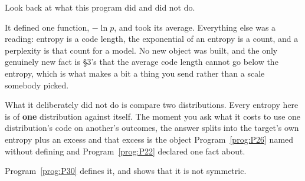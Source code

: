 \begin{fr}
Look back at what this program did and did not do.

It defined one function, $-\ln p$, and took its average. Everything else was a
reading: entropy is a code length, the exponential of an entropy is a count,
and a perplexity is that count for a model. No new object was built, and the
only genuinely new fact is §3's \dash{} that the average code length cannot go
below the entropy, which is what makes a bit a thing you send rather than a
scale somebody picked.

What it deliberately did not do is compare two distributions. Every entropy
here is of \textbf{one} distribution against itself. The moment you ask what
it costs to use one distribution's code on another's outcomes, the answer
splits into the target's own entropy plus an excess \dash{} and that excess is
the object Program~\ref{prog:P26} named without defining and
Program~\ref{prog:P22} declared one fact about.

Program~\ref{prog:P30} defines it, and shows that it is not symmetric.
\end{fr}

